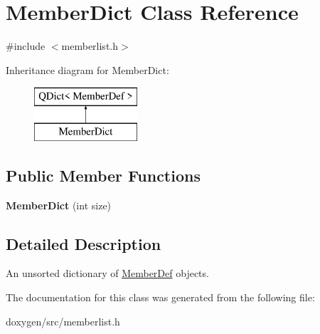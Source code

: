\hypertarget{class_member_dict}{}\section{Member\+Dict Class Reference}
\label{class_member_dict}


{\ttfamily \#include $<$memberlist.\+h$>$}

Inheritance diagram for Member\+Dict\+:\begin{figure}[H]
\begin{center}
\leavevmode
\includegraphics[height=2.000000cm]{class_member_dict}
\end{center}
\end{figure}
\subsection*{Public Member Functions}
\begin{DoxyCompactItemize}
\item 
\mbox{\label{class_member_dict_a575f20d733bba28a277ddcd8087709e2}} 
{\bfseries Member\+Dict} (int size)
\end{DoxyCompactItemize}


\subsection{Detailed Description}
An unsorted dictionary of \mbox{\hyperlink{class_member_def}{Member\+Def}} objects. 

The documentation for this class was generated from the following file\+:\begin{DoxyCompactItemize}
\item 
doxygen/src/memberlist.\+h\end{DoxyCompactItemize}
